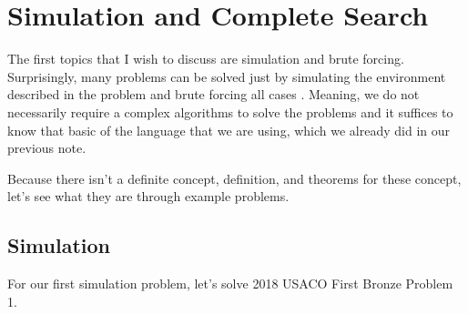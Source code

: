\documentclass[../../main.tex]{subfiles}
\begin{document}
\section{Simulation and Complete Search}

The first topics that I wish to discuss are simulation and brute
forcing. Surprisingly, many problems can be solved just by simulating
the environment described in the problem and brute forcing all cases
\cite{CS02-7}. Meaning, we do not necessarily require a complex
algorithms to solve the problems and it suffices to know that basic
of the language that we are using, which we already did in our
previous note.

Because there isn't a definite concept, definition, and theorems for
these concept, let's see what they are through example problems.

\subsection{Simulation}

For our first simulation problem, let's solve 2018 USACO First Bronze
Problem 1.
\end{document}
